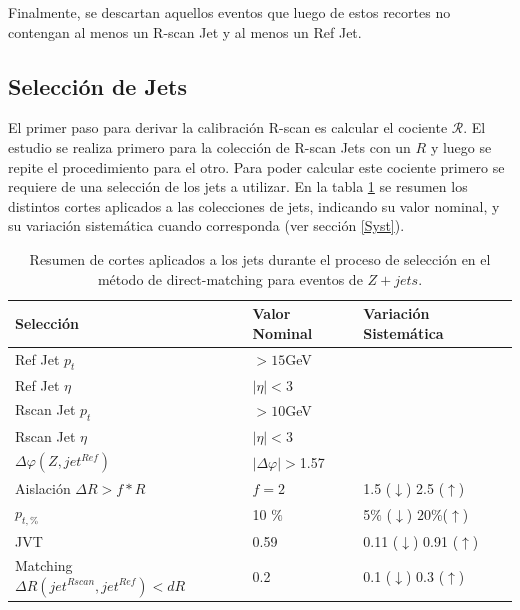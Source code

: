 Finalmente, se descartan aquellos eventos que luego de estos recortes no contengan al menos un R-scan Jet y al menos un Ref Jet.

\subsection{Selección de Jets}

El primer paso para derivar la calibración R-scan es calcular el cociente $\mathcal{R}$. El estudio se realiza primero para la colección de R-scan Jets con un $R$ y luego se repite el procedimiento para el otro. Para poder calcular este cociente primero se requiere de una selección de los jets a utilizar. En la tabla \ref{tab:sel} se resumen los distintos cortes aplicados a las colecciones de jets, indicando su valor nominal, y su variación sistemática cuando corresponda (ver sección \ref{Syst}).

\begin{table}[ht]
    \centering
    \begin{tabular}{|l|l|l|} 
        \hline
        Selección & Valor Nominal & Variación Sistemática\\ \hline\hline
        Ref Jet $p_t$  & $>15$GeV &\\ \hline
        Ref Jet $\eta$ & $|\eta|<$3 & \\ \hline
        Rscan Jet $p_t$ & $>10$GeV &  \\ \hline
        Rscan Jet $\eta$ & $|\eta|<$3 & \\ \hline
        $\Delta \varphi (Z,jet^{Ref})$ & $|\Delta\varphi|>$1.57 &\\ \hline
        Aislación $\Delta R> f*R$ & $f=2$ & 1.5 ($\downarrow$) 2.5 ($\uparrow$) \\ \hline
        $p_{t,\%}$ & 10 $\%$ & 5$\%$ ($\downarrow$) $20\%$($\uparrow$)  \\ \hline
        JVT & 0.59 & 0.11 ($\downarrow$) 0.91 ($\uparrow$) \\ \hline
        Matching $\Delta R(jet^{Rscan},jet^{Ref})<dR$ & 0.2 & 0.1 ($\downarrow$) 0.3 ($\uparrow$)\\ \hline
    \end{tabular}
    \caption{Resumen de cortes aplicados a los jets durante el proceso de selección en el método de direct-matching para eventos de $Z+jets$.}
    \label{tab:sel}
\end{table}


